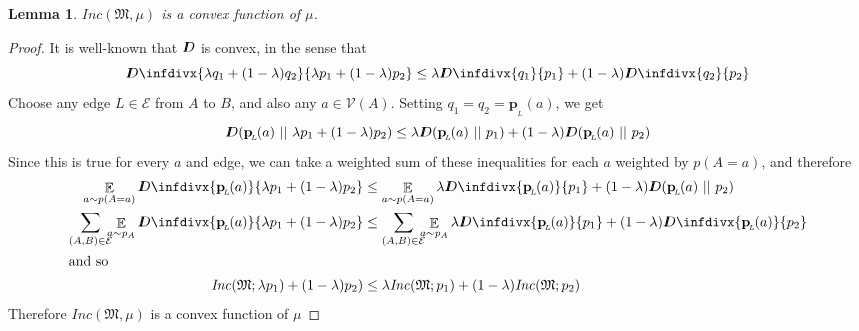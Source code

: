 \documentclass{article}
\theoremstyle{plain}
\newtheorem{lemma}[theorem]{Lemma}
\theoremstyle{definition}
\theoremstyle{remark}
\newcommand{\thickD}{I\mkern-8muD}
\newcommand{\kldiv}{\thickD\infdivx}%
\DeclareMathOperator*{\E}{\mathbb{E}} %
\newcommand\mat[1]{\mathbf{#1}}
\newcommand{\bp}[1][L]{\mat{p}_{\!_{#1}\!}}
\newcommand{\Ed}{\mathcal E}
\newcommand{\dg}[1]{\mathfrak{#1}}
\newcommand\inco{\mathit{Inc}}
\numberwithin{equation}{section}
\begin{document}
	\begin{lemma}
		\label{thm:inc-convex}
		$\inco(\dg M, \mu)$ is a convex function of $\mu$.
	\end{lemma}
	\begin{proof}
		It is well-known that $\thickD$ is convex, in the sense that 
		\[ \kldiv{\lambda q_1 + (1-\lambda) q_2 }{ \lambda p_1 + (1-\lambda) p_2} \leq \lambda \kldiv {q_1}{ p_1} + (1-\lambda) \kldiv{q_2}{p_2} \]
		Choose any edge $L \in \Ed$ from $A$ to $B$, and also any $a \in \mathcal V(A)$. 
		Setting $q_1 = q_2 = \bp(a)$, we get
		\[ \thickD(\bp(a) \ ||\ \lambda p_1 + (1-\lambda) p_2) \leq \lambda \thickD (\bp(a) \ ||\ p_1) + (1-\lambda) \thickD(\bp(a)\ ||\ p_2) \]
		Since this is true for every $a$ and edge, we can take a weighted sum of these inequalities for each $a$ weighted by $p(A=a)$, and therefore
		\begin{align*}
			\E_{a\sim p(A=a)} \kldiv{\bp(a)}{\lambda p_1 + (1-\lambda) p_2} &\leq \E_{a\sim p(A=a)}\lambda \kldiv {\bp(a)}{p_1} + (1-\lambda) \thickD(\bp(a)\ ||\ p_2) \\
			\sum_{(A, B) \in \Ed}\mskip-10mu\E_{a\sim p_A} \kldiv{\bp(a) }{\lambda p_1 + (1-\lambda) p_2} 
				&\leq \sum_{(A, B) \in \Ed}\mskip-10mu\E_{a\sim p_A}\lambda \kldiv{\bp(a)}{p_1} + (1-\lambda) \kldiv{\bp(a)}{p_2} \\
		\intertext{and so}
			\inco(\dg M ; \lambda p_1) + (1-\lambda)p_2) &\leq \lambda \inco(\dg M;p_1) + (1-\lambda) \inco(\dg M;p_2)
		\end{align*}
		Therefore $\inco(\dg M, \mu)$ is a convex function of $\mu$
	\end{proof}
\end{document}
